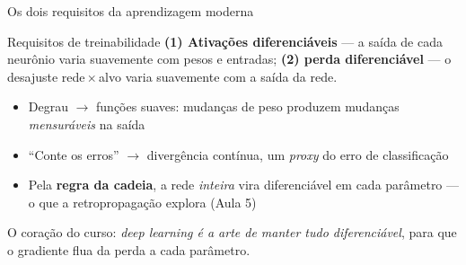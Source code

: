 \documentclass[aspectratio=169, 11pt]{beamer}
\begin{document}
\begin{frame}{Os dois requisitos da aprendizagem moderna}
  \begin{defbox}{Requisitos de treinabilidade}
    \textbf{(1) Ativações diferenciáveis} — a saída de cada neurônio varia
    suavemente com pesos e entradas; \textbf{(2) perda diferenciável} — o
    desajuste rede\,$\times$\,alvo varia suavemente com a saída da rede.
  \end{defbox}

  \begin{itemize}\setlength{\itemsep}{0.3ex}
    \item Degrau $\to$ funções suaves: mudanças de peso produzem mudanças
          \emph{mensuráveis} na saída
    \item ``Conte os erros'' $\to$ \alert{divergência contínua}, um
          \emph{proxy} do erro de classificação
    \item Pela \textbf{regra da cadeia}, a rede \emph{inteira} vira
          diferenciável em cada parâmetro — o que a retropropagação
          explora (Aula 5)
  \end{itemize}

  \begin{ideiabox}
    O coração do curso: \emph{deep learning é a arte de manter tudo
    diferenciável}, para que o gradiente flua da perda a cada parâmetro.
  \end{ideiabox}
\end{frame}
\end{document}
